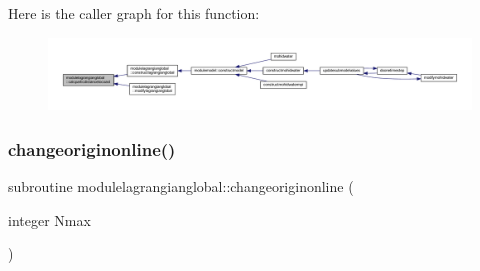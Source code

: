 Here is the caller graph for this function\+:\nopagebreak
\begin{figure}[H]
\begin{center}
\leavevmode
\includegraphics[width=350pt]{namespacemodulelagrangianglobal_a93a1f184ec51e9c61c7ac05ecf8d9364_icgraph}
\end{center}
\end{figure}
\mbox{\label{namespacemodulelagrangianglobal_ac5eba799ef6e5891159d027cee26909c}} 
\subsubsection{\texorpdfstring{changeoriginonline()}{changeoriginonline()}}
{\footnotesize\ttfamily subroutine modulelagrangianglobal\+::changeoriginonline (\begin{DoxyParamCaption}\item[{integer}]{Nmax }\end{DoxyParamCaption})\hspace{0.3cm}{\ttfamily [private]}}


